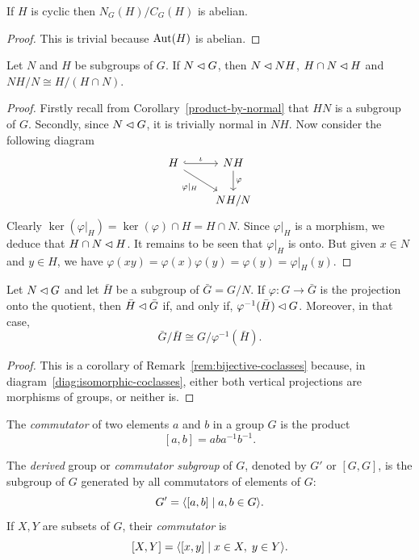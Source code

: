 \begin{cor}
    If\/ $H$ is cyclic then $N_G(H)/C_G(H)$ is abelian. 
\end{cor}

\begin{proof} This is trivial because ${\rm Aut}(H)$ is abelian.  \end{proof}

\begin{prop}\label{prod-quotient}
    Let\/ $N$ and\/ $H$ be subgroups of\/ $G$. If $N \lhd G$, then $N\lhd NH$, $H \cap N \lhd H$ and $NH/N \cong H/(H \cap N)$.
\end{prop}

\begin{proof} Firstly recall from Corollary~\ref{product-by-normal} that $HN$ is a subgroup of $G$. Secondly, since $N\lhd G$, it is trivially normal in $NH$. Now consider the following diagram
$$
    \begin{tikzcd}
        H \arrow[r, "\iota", hook]\arrow[rd,"\varphi|_H", swap]
        & NH \arrow[d, "\varphi"]\\
        & NH/N
    \end{tikzcd}
$$
Clearly $\ker(\varphi|_H)=\ker(\varphi)\cap H= H\cap N$. Since $\varphi|_H$ is a morphism, we deduce that $H\cap N\lhd H$. It remains to be seen that $\varphi|_H$ is onto. But given $x\in N$ and $y\in H$, we have $\varphi(xy) = \varphi(x)\varphi(y) = \varphi(y) = \varphi|_H(y)$.  \end{proof}


\begin{prop}\label{quotient-preserves-normal}
    Let $N\lhd G$ and let $\bar H$ be a subgroup of\/ $\bar G=G/N$. If $\varphi\colon G\to\bar G$ is the projection onto the quotient, then $\bar H\lhd\bar G$ if, and only if, $\varphi^{-1}(\bar H)\lhd G$. Moreover, in that case,
    $$
        \bar G/\bar H\cong G/\varphi^{-1}(\bar H).
    $$
\end{prop}

\begin{proof}
    This is a corollary of Remark~\ref{rem:bijective-coclasses} because, in diagram~\eqref{diag:isomorphic-coclasses}, either both vertical projections are morphisms of groups, or neither is.
\end{proof}

\begin{defns}{\upshape[Commutator]}
    The \textsl{commutator} of two elements $a$ and $b$ in a group\/ $G$ is the product 
    $$
        [a,b] = aba^{-1}b^{-1}.
    $$
        
    The \textsl{derived} group or \textsl{commutator subgroup} of\/ $G$, denoted by\/ $G'$ or $[G,G]$, is the subgroup of $G$ generated by all commutators of elements of\/ $G$:
    $$
        G' = \langle[a,b] \mid a,b \in G\rangle.
    $$
    If $X,Y$ are subsets of $G$, their \textsl{commutator} is
    $$
        [X,Y] = \langle[x,y] \mid x\in X,\; y\in Y\rangle.
    $$
\end{defns}

